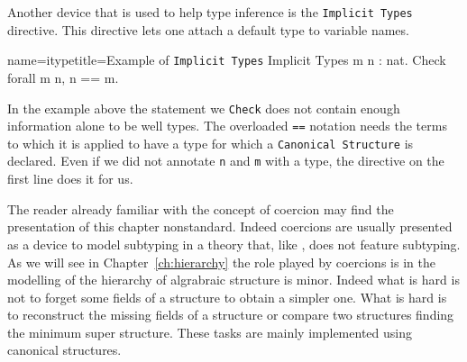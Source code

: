 Another device that is used to help type inference is the
\lstinline/Implicit Types/ directive.  This directive lets
one attach a default type to variable names.

\begin{coq}{name=itype}{title=Example of \lstinline/Implicit Types/}
Implicit Types m n : nat.
Check forall m n, n == m.
\end{coq}

In the example above the statement we \lstinline/Check/ does not
contain enough information alone to be well types.  The overloaded
\lstinline/==/ notation needs the terms to which it is applied to
have a type for which a \lstinline/Canonical Structure/ is declared.
Even if we did not annotate \lstinline/n/ and \lstinline/m/ with a
type, the directive on the first line does it for us.

The reader already familiar with the concept of coercion
may find the presentation of this chapter nonstandard.
Indeed coercions are usually presented as a device to model
subtyping in a theory that, like \mcbCIC{}, does not
feature subtyping.  As we will see in Chapter~\ref{ch:hierarchy}
the role played by coercions is in the modelling of the hierarchy
of algrabraic structure is minor.  Indeed what is hard is not to
forget some fields of a structure to obtain a simpler one.  What
is hard is to reconstruct the missing fields of a structure
or compare two structures finding the minimum super structure.
These tasks are mainly implemented using canonical structures.

